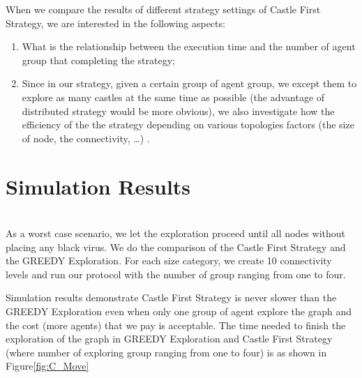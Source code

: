 When we compare the results of different strategy settings of Castle First Strategy, we are interested in the following aspects: 
\begin{enumerate}
\item What is the relationship between the execution time and the number of agent group that completing the strategy;
\item Since in our strategy, given a certain group of agent group, we except them to explore as many castles at the same time as possible (the advantage of distributed strategy would be more obvious), we also investigate how the efficiency of the the strategy depending on various topologies factors (the size of node, the connectivity, \ldots) .
\end{enumerate}


\section{Simulation Results}
\\
As a worst case scenario, we let the exploration proceed until all nodes without placing any black virus. We do the comparison of the Castle First Strategy and the GREEDY Exploration. For each size category, we create 10 connectivity levels and run our protocol with the number of group ranging from one to four.

Simulation results demonstrate Castle First Strategy is never slower than the GREEDY Exploration even when only one group of agent explore the graph and the cost (more agents) that we pay is acceptable. The time needed to finish the exploration of the graph in GREEDY Exploration and Castle First Strategy (where number of exploring group ranging from one to four) is as shown in Figure\ref{fig:C_Move} 

